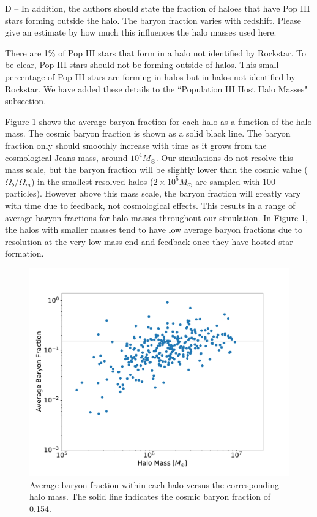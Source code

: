 \documentclass[11pt]{article}
\newenvironment{referee}[1][]{%
    \ignorespaces%
    \begin{mdframed}[style=myquotestyle,#1]%
}{%
    \end{mdframed}%
    \ignorespacesafterend%
}%
\begin{document}
\begin{referee}
D -- In addition, the authors should state the fraction of haloes that have Pop III stars forming outside the halo. The baryon fraction varies with redshift. Please give an estimate by how much this influences the halo masses used here.
\end{referee}

There are 1\% of Pop III stars that form in a halo not identified by Rockstar.  To be clear, Pop III stars should not be forming outside of halos. This small percentage of Pop III stars are forming in halos but in halos not identified by Rockstar.  We have added these details to the ``Population III Host Halo Masses" subsection.


Figure \ref{fig:avg_baryon_fraction} shows the average baryon fraction for each halo as a function of the halo mass. The cosmic baryon fraction is shown as a solid black line. The baryon fraction only should smoothly increase with time as it grows from the cosmological Jeans mass, around $10^{4} M_{\odot}$.  Our simulations do not resolve this mass scale, but the baryon fraction will be slightly lower than the cosmic value ($\Omega_b/\Omega_m$) in the smallest resolved halos ($2 \times 10^5 M_\odot$ are sampled with 100 particles).  However above this mass scale, the baryon fraction will greatly vary with time due to feedback, not cosmological effects. This results in a range of average baryon fractions for halo masses throughout our simulation. In Figure \ref{fig:avg_baryon_fraction}, the halos with smaller masses tend to have low average baryon fractions due to resolution at the very low-mass end and feedback once they have hosted star formation.

\begin{figure}[ht!]
  \centering
  \includegraphics[keepaspectratio=true, scale=0.4]{images/avg_baryon_fraction.pdf}
  \caption{\label{fig:avg_baryon_fraction} Average baryon fraction within each halo versus the corresponding halo mass. The solid line indicates the cosmic baryon fraction of 0.154.}
\end{figure}
\end{document}
